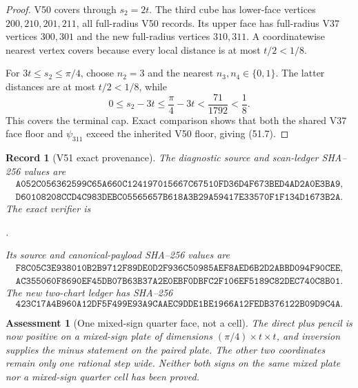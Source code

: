 \documentclass[11pt,oneside]{article}
\newtheorem{assessment}[theorem]{Assessment}
\newtheorem{record}[theorem]{Record}
\theoremstyle{definition}
\theoremstyle{remark}
\begin{document}
\begin{proof}
V50 covers through \(s_2=2t\).  The third cube has lower-face
vertices \(200,210,201,211\), all full-radius V50 records.  Its
upper face has full-radius V37 vertices \(300,301\) and the new
full-radius vertices \(310,311\).  A coordinatewise nearest vertex
covers because every local distance is at most \(t/2<1/8\).

For \(3t\le s_2\le\pi/4\), choose \(n_2=3\) and the nearest
\(n_3,n_4\in\{0,1\}\).  The latter distances are at most
\(t/2<1/8\), while
\[
 0\le s_2-3t\le\frac{\pi}{4}-3t
 <\frac{71}{1792}<\frac18.                            \tag{51.8}
\]
This covers the terminal cap.  Exact comparison shows that both
the shared V37 face floor and \(\psi_{311}\) exceed the inherited
V50 floor, giving (51.7).
\end{proof}

\begin{record}[V51 exact provenance]
\label{rec:newv51-provenance}
The diagnostic source and scan-ledger SHA--256 values are
\[
\begin{gathered}
\texttt{A052C056362599C65A660C124197015667C67510FD36D4F673BED4AD2A0E3BA9},\\
\texttt{D60108208CCD4C983DEBC05565657B618A3B29A59417E33570F1F134D1673B2A}.
\end{gathered}                                         \tag{51.9}
\]
The exact verifier is
\begin{center}
\footnotesize
{}.
\end{center}
Its source and canonical-payload SHA--256 values are
\[
\begin{gathered}
\texttt{F8C05C3E938010B2B9712F89DE0D2F936C50985AEF8AED6B2D2ABBD094F90CEE},\\
\texttt{AC355060F8690EF45DB07B63B37A2E0EBF0DBFC2F106EF5189C82DEC740C8B01}.
\end{gathered}                                         \tag{51.10}
\]
The new two-chart ledger has SHA--256
\[
\texttt{423C17A4B960A12DF5F499E93A9CAAEC9DDE1BE1966A12FEDB376122B09D9C4A}.
                                                               \tag{51.11}
\]
\end{record}

\begin{assessment}[One mixed-sign quarter face, not a cell]
\label{ass:newv51}
The direct plus pencil is now positive on a mixed-sign plate of
dimensions \((\pi/4)\times t\times t\), and inversion supplies the
minus statement on the paired plate.  The other two coordinates
remain only one rational step wide.  Neither both signs on the same
mixed plate nor a mixed-sign quarter cell has been proved.
\end{assessment}
\end{document}
